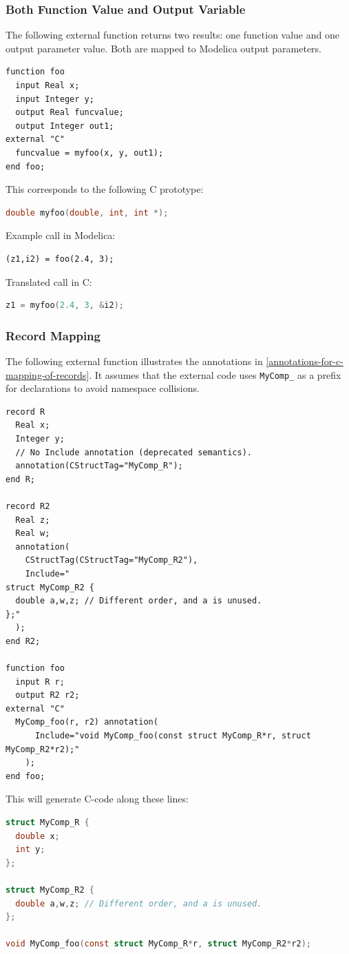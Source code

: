 \subsubsection{Both Function Value and Output Variable}\label{external-function-with-both-function-value-and-output-variable}\label{both-function-value-and-output-variable}

\begin{example}
The following external function returns two results: one function value and one output parameter value.
Both are mapped to Modelica output parameters.
\begin{lstlisting}[language=modelica]
function foo
  input Real x;
  input Integer y;
  output Real funcvalue;
  output Integer out1;
external "C"
  funcvalue = myfoo(x, y, out1);
end foo;
\end{lstlisting}
This corresponds to the following C prototype:
\begin{lstlisting}[language=C]
double myfoo(double, int, int *);
\end{lstlisting}
Example call in Modelica:
\begin{lstlisting}[language=modelica]
(z1,i2) = foo(2.4, 3);
\end{lstlisting}
Translated call in C:
\begin{lstlisting}[language=C]
z1 = myfoo(2.4, 3, &i2);
\end{lstlisting}
\end{example}

\subsubsection{Record Mapping}\label{record-mapping-example}

\begin{example}
The following external function illustrates the annotations in \cref{annotations-for-c-mapping-of-records}.
It assumes that the external code uses \lstinline!MyComp_! as a prefix for declarations to avoid namespace collisions.
\begin{lstlisting}[language=modelica]
record R
  Real x;
  Integer y;
  // No Include annotation (deprecated semantics).
  annotation(CStructTag="MyComp_R");
end R;

record R2
  Real z;
  Real w;
  annotation(
    CStructTag(CStructTag="MyComp_R2"),
    Include="
struct MyComp_R2 {
  double a,w,z; // Different order, and a is unused.
};"
  );
end R2;

function foo
  input R r;
  output R2 r2;
external "C"
  MyComp_foo(r, r2) annotation(
      Include="void MyComp_foo(const struct MyComp_R*r, struct MyComp_R2*r2);"
    );
end foo;
\end{lstlisting}
This will generate C-code along these lines:
\begin{lstlisting}[language=C]
struct MyComp_R {
  double x;
  int y;
};

struct MyComp_R2 {
  double a,w,z; // Different order, and a is unused.
};

void MyComp_foo(const struct MyComp_R*r, struct MyComp_R2*r2);
\end{lstlisting}
\end{example}

